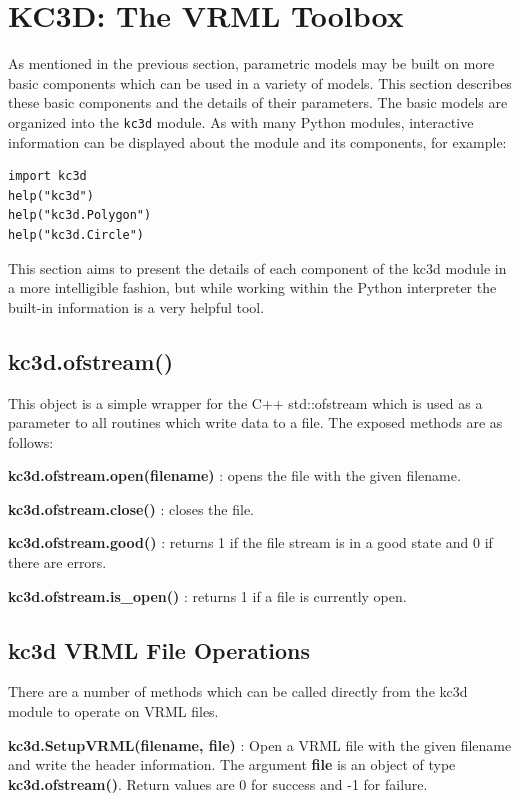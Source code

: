 \section{KC3D: The VRML Toolbox}
As mentioned in the previous section, parametric models may be built on more
basic components which can be used in a variety of models. This section
describes these basic components and the details of their parameters. The
basic models are organized into the \verb#kc3d# module. As with many Python
modules, interactive information can be displayed about the module and
its components, for example:

\begin{verbatim}
import kc3d
help("kc3d")
help("kc3d.Polygon")
help("kc3d.Circle")
\end{verbatim}

This section aims to present the details of each component of the kc3d module
in a more intelligible fashion, but while working within the Python interpreter
the built-in information is a very helpful tool.


\subsection{kc3d.ofstream()}
This object is a simple wrapper for the C++ std::ofstream which is used as
a parameter to all routines which write data to a file. The exposed methods
are as follows:

\textbf{kc3d.ofstream.open(filename)} : opens the file with the given filename.

\textbf{kc3d.ofstream.close()} : closes the file.

\textbf{kc3d.ofstream.good()} : returns 1 if the file stream is in a good state
and 0 if there are errors.

\textbf{kc3d.ofstream.is\_open()} : returns 1 if a file is currently open.

\subsection{kc3d VRML File Operations}
There are a number of methods which can be called directly from the
kc3d module to operate on VRML files.

\textbf{kc3d.SetupVRML(filename, file)} : Open a VRML file with the given
filename and write the header information. The argument \textbf{file}
is an object of type \textbf{kc3d.ofstream()}.  Return values are
0 for success and -1 for failure.

